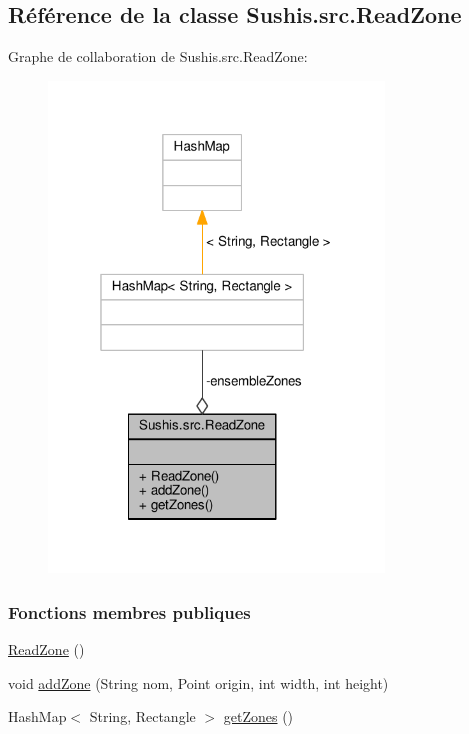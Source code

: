\hypertarget{classSushis_1_1src_1_1ReadZone}{}\subsection{Référence de la classe Sushis.\+src.\+Read\+Zone}
\label{classSushis_1_1src_1_1ReadZone}


Graphe de collaboration de Sushis.\+src.\+Read\+Zone\+:\nopagebreak
\begin{figure}[H]
\begin{center}
\leavevmode
\includegraphics[width=253pt]{classSushis_1_1src_1_1ReadZone__coll__graph}
\end{center}
\end{figure}
\subsubsection*{Fonctions membres publiques}
\begin{DoxyCompactItemize}
\item 
\hyperlink{classSushis_1_1src_1_1ReadZone_a1fd767e508cbc3ce6bbdef61d3ba9b8f}{Read\+Zone} ()
\item 
void \hyperlink{classSushis_1_1src_1_1ReadZone_a142e2eb0d5890f48f92825f7deaabc12}{add\+Zone} (String nom, Point origin, int width, int height)
\item 
Hash\+Map$<$ String, Rectangle $>$ \hyperlink{classSushis_1_1src_1_1ReadZone_abaef7d55c09d629dddc128a4a17d7d5d}{get\+Zones} ()
\end{DoxyCompactItemize}
